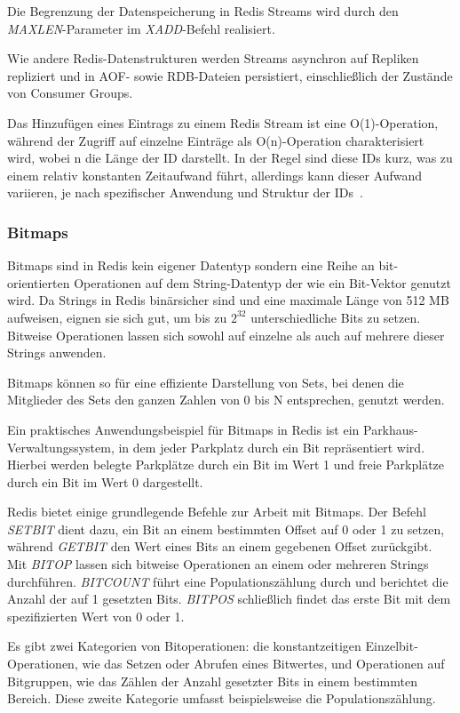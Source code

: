 Die Begrenzung der Datenspeicherung in Redis Streams wird durch den \emph{MAXLEN}-Parameter im \emph{XADD}-Befehl realisiert.

Wie andere Redis-Datenstrukturen werden Streams asynchron auf Repliken repliziert und in AOF- sowie RDB-Dateien persistiert, einschließlich der Zustände von Consumer Groups.

Das Hinzufügen eines Eintrags zu einem Redis Stream ist eine O(1)-Operation, während der Zugriff auf einzelne Einträge als O(n)-Operation charakterisiert wird, wobei n die Länge der ID darstellt. In der Regel sind diese IDs kurz, was zu einem relativ konstanten Zeitaufwand führt, allerdings kann dieser Aufwand variieren, je nach spezifischer Anwendung und Struktur der IDs~\cite{redis_ltd_streams_nodate}.

\subsubsection{Bitmaps}
Bitmaps sind in Redis kein eigener Datentyp sondern eine Reihe an bit-orientierten Operationen auf dem String-Datentyp der wie ein Bit-Vektor genutzt wird. Da Strings in Redis binärsicher sind und eine maximale Länge von 512 MB aufweisen, eignen sie sich gut, um bis zu \(2^{32}\) unterschiedliche Bits zu setzen.
Bitweise Operationen lassen sich sowohl auf einzelne als auch auf mehrere dieser Strings anwenden.

Bitmaps können so für eine effiziente Darstellung von Sets, bei denen die Mitglieder des Sets den ganzen Zahlen von 0 bis N entsprechen, genutzt werden.

Ein praktisches Anwendungsbeispiel für Bitmaps in Redis ist ein Park\-haus-Ver\-wal\-tungs\-system, in dem jeder Parkplatz durch ein Bit repräsentiert wird. Hierbei werden belegte Parkplätze durch ein Bit im Wert 1 und freie Parkplätze durch ein Bit im Wert 0 dargestellt.

Redis bietet einige grundlegende Befehle zur Arbeit mit Bitmaps. Der Befehl \emph{SETBIT} dient dazu, ein Bit an einem bestimmten Offset auf 0 oder 1 zu setzen, während \emph{GETBIT} den Wert eines Bits an einem gegebenen Offset zurückgibt. Mit \emph{BITOP} lassen sich bitweise Operationen an einem oder mehreren Strings durchführen. \emph{BITCOUNT} führt eine Populationszählung durch und berichtet die Anzahl der auf 1 gesetzten Bits. \emph{BITPOS} schließlich findet das erste Bit mit dem spezifizierten Wert von 0 oder 1.

Es gibt zwei Kategorien von Bitoperationen: die konstantzeitigen Ein\-zel\-bit-O\-pe\-ra\-ti\-o\-nen, wie das Setzen oder Abrufen eines Bitwertes, und Operationen auf Bitgruppen, wie das Zählen der Anzahl gesetzter Bits in einem bestimmten Bereich. Diese zweite Kategorie umfasst beispielsweise die Populationszählung.

